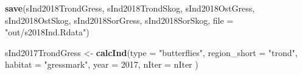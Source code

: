\documentclass[]{article}
\newenvironment{Shaded}{\begin{snugshade}}{\end{snugshade}}
\newcommand{\KeywordTok}[1]{\textcolor[rgb]{0.13,0.29,0.53}{\textbf{#1}}}
\newcommand{\DataTypeTok}[1]{\textcolor[rgb]{0.13,0.29,0.53}{#1}}
\newcommand{\DecValTok}[1]{\textcolor[rgb]{0.00,0.00,0.81}{#1}}
\newcommand{\StringTok}[1]{\textcolor[rgb]{0.31,0.60,0.02}{#1}}
\newcommand{\NormalTok}[1]{#1}
\begin{document}
\begin{Shaded}
\begin{Highlighting}[]
\KeywordTok{save}\NormalTok{(sInd2018TrondGress, sInd2018TrondSkog, sInd2018OstGress, sInd2018OstSkog, sInd2018SorGress, sInd2018SorSkog, }\DataTypeTok{file =} \StringTok{"out/s2018Ind.Rdata"}\NormalTok{)}
\end{Highlighting}
\end{Shaded}

\begin{Shaded}
\begin{Highlighting}[]
\NormalTok{sInd2017TrondGress <-}\StringTok{ }\KeywordTok{calcInd}\NormalTok{(}\DataTypeTok{type =} \StringTok{"butterflies"}\NormalTok{,}
                              \DataTypeTok{region_short =} \StringTok{"trond"}\NormalTok{,}
                              \DataTypeTok{habitat =} \StringTok{"gressmark"}\NormalTok{,}
                              \DataTypeTok{year =} \DecValTok{2017}\NormalTok{,}
                              \DataTypeTok{nIter =}\NormalTok{ nIter}
\NormalTok{                              )}
       

\end{Highlighting}
\end{Shaded}
\end{document}
